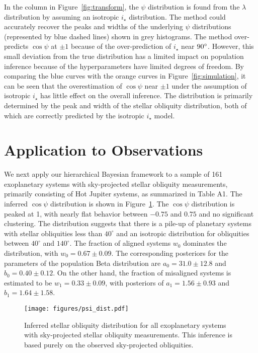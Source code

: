 \documentclass[twocolumn,times]{aastex631}
\begin{document}
In the  column in Figure~\ref{fig:transform}, the $\psi$ distribution is found from the $\lambda$ distribution by assuming an isotropic $i_\star$ distribution. The method could accurately recover the peaks and widths of the underlying $\psi$ distributions (represented by blue dashed lines) shown in grey histograms. The method over-predicts $\cos{\psi}$ at $\pm 1$ because of the over-prediction of $i_\star$ near $90\mbox{$^\circ$}$. However, this small deviation from the true distribution has a limited impact on population inference because of the hyperparameters have limited degrees of freedom. By comparing the blue curves with the orange curves in Figure~\ref{fig:simulation}, it can be seen that the overestimation of $\cos{\psi}$ near $\pm1$ under the assumption of isotropic $i_\star$ has little effect on the overall inference. The distribution is primarily determined by the peak and width of the stellar obliquity distribution, both of which are correctly predicted by the isotropic $i_\star$ model.

\section{Application to Observations}\label{sec:observation}

We next apply our hierarchical Bayesian framework to a sample of 161 exoplanetary systems with sky-projected stellar obliquity measurements, primarily consisting of Hot Jupiter systems, as summarized in \cite{Albrecht22} Table A1.
The inferred $\cos{\psi}$ distribution is shown in Figure~\ref{fig:psi_dist}. The $\cos{\psi}$ distribution is peaked at 1, with nearly flat behavior between $-0.75$ and $0.75$ and no significant clustering. The distribution suggests that there is a pile-up of planetary systems with stellar obliquities less than $40^\circ$ and an isotropic distribution for obliquities between $40^\circ$ and $140^\circ$.
The fraction of aligned systems $w_0$ dominates the distribution, with $w_0 = 0.67 \pm 0.09$. The corresponding posteriors for the parameters of the population Beta distribution are $a_0 = 31.0\pm12.8$ and $b_0 = 0.40\pm0.12$. On the other hand, the fraction of misaligned systems is estimated to be $w_1 = 0.33 \pm 0.09$, with posteriors of $a_1 = 1.56\pm0.93$ and $b_1 = 1.64\pm1.58$.

\begin{figure}[ht!]
    \begin{centering}
        \texttt{[image: figures/psi\_dist.pdf]}
        \caption{Inferred stellar obliquity distribution for all exoplanetary systems with sky-projected stellar obliquity measurements. This inference is based purely on the observed sky-projected obliquities.}
        \label{fig:psi_dist}
    \end{centering}
\end{figure}
\end{document}
